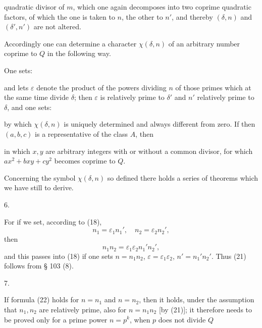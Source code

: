 
quadratic divisor of $m$, which one again decomposes into two coprime
quadratic factors, of which the one is taken to $n$, the other
to $n'$, and thereby $(\delta, n)$ and
$(\delta', n')$ are not altered.

Accordingly one can determine a character $\chi(\delta, n)$ of an arbitrary
number coprime to $Q$ in the following way.

One sets:


and lets $\varepsilon$ denote the product of the powers dividing $n$ of
those primes which at the same time divide $\delta$; then $\varepsilon$ is relatively
prime to $\delta'$ and $n'$ relatively prime to $\delta$, and one sets:


by which $\chi(\delta, n)$ is uniquely determined and always different from zero. If then $(a, b, c)$ is a representative of the class $A$,
then


in which $x, y$ are arbitrary integers with or without a common
divisor, for which $ax^2 + bxy + cy^2$ becomes coprime to $Q$.

Concerning the symbol $\chi(\delta, n)$ so defined there holds a series of
theorems which we have still to derive.

6. 


For if we set, according to (18),
\[
n_1 = \varepsilon_1 n_1', \quad n_2 = \varepsilon_2 n_2',
\]
then
\[
n_1 n_2 = \varepsilon_1 \varepsilon_2 n_1' n_2',
\]
and this passes into (18) if one sets $n = n_1n_2$, $\varepsilon = \varepsilon_1\varepsilon_2$,
$n' = n_1'n_2'$. Thus (21) follows from § 103 (8).

7. 


If formula (22) holds for $n = n_1$ and $n = n_2$, then it holds,
under the assumption that $n_1, n_2$ are relatively prime, also
for $n = n_1n_2$ [by (21)]; it therefore needs to be proved only for a
prime power $n = p^k$, when $p$ does not divide $Q$
